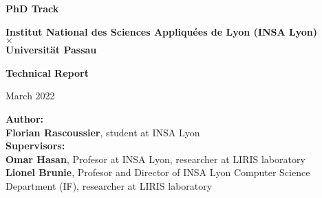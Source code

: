 \begin{titlepage}
    \begin{center}
        \vspace{1cm}
        \Large
        \textbf{PhD Track}

        \vspace{0.5cm}
        \normalsize
        \textbf{Institut National des Sciences Appliquées de Lyon (INSA Lyon)}\\
        $\times$ \\ %
        \textbf{Universität Passau}

        \vspace{2cm}
        \Huge
        \textbf{Technical Report}

        \vspace{1cm}
        \normalsize
        March 2022
        
        \vspace{2cm}

        \Large
        \textbf{Author:}\\
        \normalsize
        \textbf{Florian Rascoussier}, student at INSA Lyon\\

        \vspace{0.5cm}
        \Large
        \textbf{Supervisors:}\\

        \vspace{0.5cm}
        \normalsize
        \textbf{Omar Hasan}, Profesor at INSA Lyon, researcher at LIRIS laboratory\\
        \textbf{Lionel Brunie}, Profesor and Director of INSA Lyon Computer Science Department (IF), researcher at LIRIS laboratory\\
        
        
        
        \vfill
            
    \end{center}
\end{titlepage}
